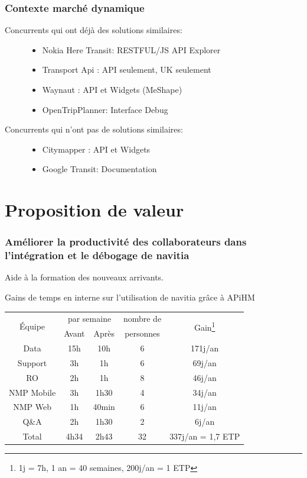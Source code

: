 \documentclass[table]{beamer}
\begin{document}
\begin{frame}
  \frametitle{Contexte marché dynamique}
  \begin{description}
  \item[Concurrents qui ont déjà des solutions similaires: ]\strut\par
    \begin{itemize}
    \item Nokia Here Transit: RESTFUL/JS API Explorer
    \item Transport Api : API seulement, UK seulement
    \item Waynaut :  API et Widgets (MeShape)
    \item OpenTripPlanner: Interface Debug
    \end{itemize}
  \item[Concurrents qui n'ont pas de solutions similaires: ]\strut\par
    \begin{itemize}
    \item Citymapper : API et Widgets 
    \item Google Transit: Documentation
    \end{itemize}
  \end{description}
\end{frame}

\section{Proposition de valeur}

\begin{frame}
  \frametitle{Améliorer la productivité des collaborateurs dans
    l'intégration et le débogage de navitia}

  Aide à la formation des nouveaux arrivants.

  Gains de temps en interne sur l'utilisation de navitia
  grâce à APiHM
  \vfill
  \centering
  \begin{tabular}{|c|c|c|c|c|}
    \hline
    \multirow{2}{*}{Équipe}& \multicolumn{2}{c|}{par
      semaine}&nombre de&\multirow{2}{*}{Gain\footnote{1j = 7h,
        1 an = 40 semaines, 200j/an = 1 ETP}}\\
    \hhline{~--~~}
    & Avant & Après & personnes &\\
    \hline
    Data       &15h &10h & 6 & 171j/an\\
    Support    & 3h & 1h & 6 &  69j/an\\
    RO         & 2h & 1h & 8 &  46j/an\\
    NMP Mobile & 3h &1h30& 4 &  34j/an\\
    NMP Web    & 1h &40min&6 &  11j/an\\
    Q\&A       & 2h &1h30& 2 &   6j/an\\
    \hline
    Total      &4h34&2h43&32 &337j/an = 1{,}7 ETP\\
    \hline
  \end{tabular}
\end{frame}
\end{document}
